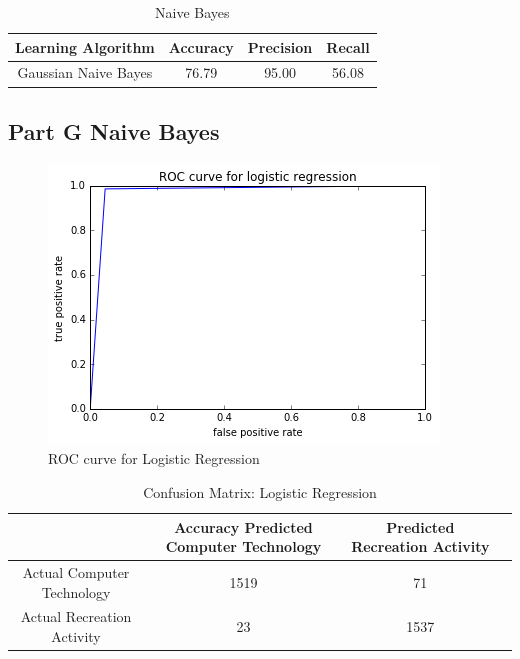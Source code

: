 \documentclass[11pt]{article}
\begin{document}
\begin{table}[h]
	\centering
	\begin{tabular}{|c|c|c|c|} \hline
		Learning Algorithm & Accuracy & Precision & Recall\\ \hline
		Gaussian Naive Bayes& 76.79 & 95.00 & 56.08 \\
		\hline
	\end{tabular}
	\caption{Naive Bayes}
	\label{table:ovr_res}
\end{table}

\subsection{Part G Naive Bayes}

\begin{figure}[h]
	
	\includegraphics[width=\textwidth]{ROC_LogisticRegression.png}
	\caption{ROC curve for Logistic Regression}
\end{figure}

\begin{table}[h]
	\centering
	\begin{tabular}{|c|c|c|c|} \hline
		& Accuracy 		Predicted Computer Technology & Predicted Recreation Activity \\ \hline
		Actual Computer Technology & 1519 & 71 \\
		Actual Recreation Activity & 23& 1537  \\
		\hline
	\end{tabular}
	\caption{Confusion Matrix: Logistic Regression}
	\label{table:ovr_res}
\end{table}
\end{document}
